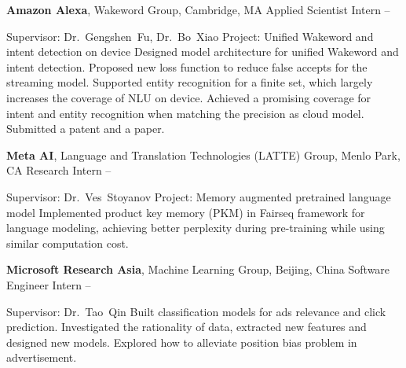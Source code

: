 \documentclass[letterpaper,MMMyyyy,nonstopmode]{simpleresumecv}
\begin{document}
\begin{Body}
\BigGap
\Entry
\textbf{Amazon Alexa},
Wakeword Group, Cambridge, MA
\BulletItem
Applied Scientist Intern
\hfill
{} --
\begin{Detail}
\SubBulletItem
Supervisor:
Dr.~Gengshen~Fu, Dr.~Bo~Xiao
\SubBulletItem
Project:
Unified Wakeword and intent detection on device
\SubBulletItem
Designed model architecture for unified Wakeword and intent detection.
\SubBulletItem
Proposed new loss function to reduce false accepts for the streaming model.
\SubBulletItem
Supported entity recognition for a finite set, which largely increases the coverage of NLU on device.
\SubBulletItem
Achieved a promising coverage for intent and entity recognition when matching the precision as cloud model.
\SubBulletItem
Submitted a patent and a paper.
\end{Detail}

\BigGap
\Entry
\textbf{Meta AI},
Language and Translation Technologies (LATTE) Group, Menlo Park, CA
\BulletItem
Research Intern
\hfill
{} --
\begin{Detail}
\SubBulletItem
Supervisor:
Dr.~Ves~Stoyanov
\SubBulletItem
Project:
Memory augmented pretrained language model
\SubBulletItem
Implemented product key memory (PKM) in Fairseq framework for language modeling, achieving better perplexity during pre-training while using similar computation cost.
\end{Detail}

\BigGap
\Entry
\textbf{Microsoft Research Asia},
Machine Learning Group, Beijing, China
\BulletItem
Software Engineer Intern
\hfill
{} --
\begin{Detail}
\SubBulletItem
Supervisor:
Dr.~Tao~Qin
\SubBulletItem
Built classification models for ads relevance and click prediction.
\SubBulletItem
Investigated the rationality of data, extracted new features and designed new models.
\SubBulletItem
Explored how to alleviate position bias problem in advertisement.
\end{Detail}


\end{Body}
\end{document}
